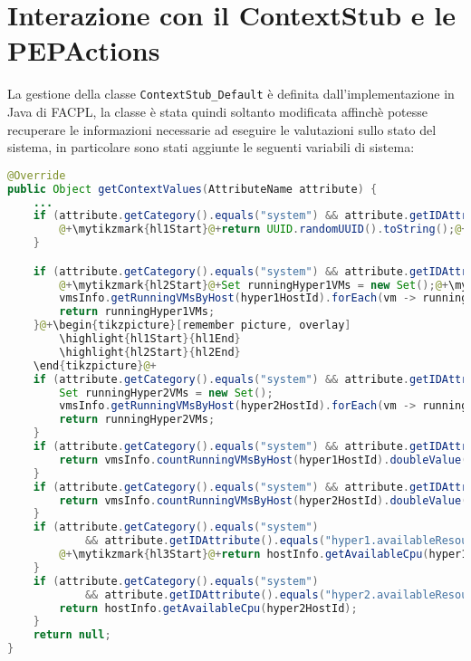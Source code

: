 \section{Interazione con il ContextStub e le PEPActions}
La gestione della classe \texttt{ContextStub\_Default} è definita dall'implementazione in Java di FACPL, la classe è stata quindi soltanto modificata affinchè potesse recuperare le informazioni necessarie ad eseguire le valutazioni sullo stato del sistema, in particolare sono stati aggiunte le seguenti variabili di sistema:
\begin{lstlisting}[language=Java, caption=Context di OpenNebula, label=code:ContextStubChoice, basicstyle=\fontsize{9}{10}\ttfamily]
@Override
public Object getContextValues(AttributeName attribute) {
    ...
    if (attribute.getCategory().equals("system") && attribute.getIDAttribute().equals("vm-name")) {
        @+\mytikzmark{hl1Start}@+return UUID.randomUUID().toString();@+\mytikzmark{hl1End}@+
    }

    if (attribute.getCategory().equals("system") && attribute.getIDAttribute().equals("hyper1.vm-names")) {
        @+\mytikzmark{hl2Start}@+Set runningHyper1VMs = new Set();@+\mytikzmark{hl2End}@+
        vmsInfo.getRunningVMsByHost(hyper1HostId).forEach(vm -> runningHyper1VMs.addValue(vm.getVmName()));
        return runningHyper1VMs;
    }@+\begin{tikzpicture}[remember picture, overlay]
        \highlight{hl1Start}{hl1End}
        \highlight{hl2Start}{hl2End}
    \end{tikzpicture}@+
    if (attribute.getCategory().equals("system") && attribute.getIDAttribute().equals("hyper2.vm-names")) {
        Set runningHyper2VMs = new Set();
        vmsInfo.getRunningVMsByHost(hyper2HostId).forEach(vm -> runningHyper2VMs.addValue(vm.getVmName()));
        return runningHyper2VMs;
    }
    if (attribute.getCategory().equals("system") && attribute.getIDAttribute().equals("hyper1.vm1-counter")) {
        return vmsInfo.countRunningVMsByHost(hyper1HostId).doubleValue();
    }
    if (attribute.getCategory().equals("system") && attribute.getIDAttribute().equals("hyper2.vm1-counter")) {
        return vmsInfo.countRunningVMsByHost(hyper2HostId).doubleValue();
    }
    if (attribute.getCategory().equals("system")
            && attribute.getIDAttribute().equals("hyper1.availableResources")) {
        @+\mytikzmark{hl3Start}@+return hostInfo.getAvailableCpu(hyper1HostId);@+\mytikzmark{hl3End}@+
    }
    if (attribute.getCategory().equals("system")
            && attribute.getIDAttribute().equals("hyper2.availableResources")) {
        return hostInfo.getAvailableCpu(hyper2HostId);
    }
    return null;
}
\end{lstlisting}
